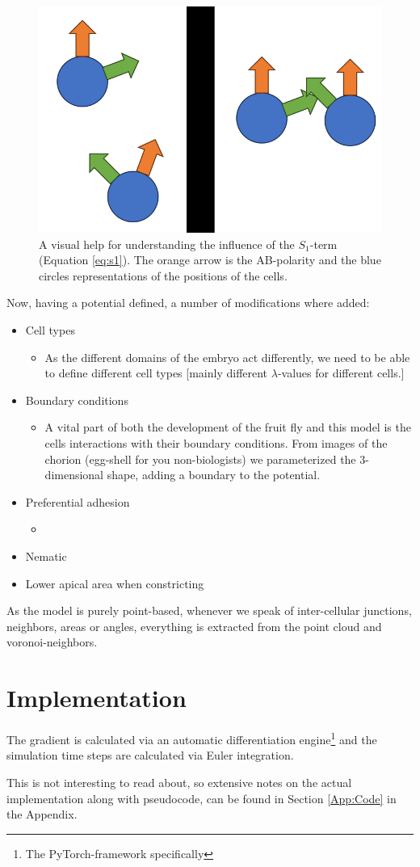 \begin{figure}[H]
    \centering
    \includegraphics[width=0.3\linewidth]{chapters/Theory/figures/explainS1.png}
    \caption{A visual help for understanding the influence of the $S_1$-term (Equation \ref{eq:s1}). The orange arrow is the AB-polarity and the blue circles representations of the positions of the cells.}
    \label{fig:explain-S1}
\end{figure}

Now, having a potential defined, a number of modifications where added:
\begin{itemize}
    \item Cell types
        \begin{itemize}
            \item As the different domains of the embryo act differently, we need to be able to define different cell types [mainly different $\lambda$-values for different cells.]
        \end{itemize}
    \item Boundary conditions
        \begin{itemize}
            \item A vital part of both the development of the fruit fly and this model is the cells interactions with their boundary conditions. From images of the chorion (egg-shell for you non-biologists) we parameterized the 3-dimensional shape, adding a boundary to the potential. 
        \end{itemize}
    \item Preferential adhesion
        \begin{itemize}
            \item 
        \end{itemize}
    \item Nematic 
    \item Lower apical area when constricting
\end{itemize}


As the model is purely point-based, whenever we speak of inter-cellular junctions, neighbors, areas or angles, everything is extracted from the point cloud and voronoi-neighbors.

\section{Implementation}
The gradient is calculated via an automatic differentiation engine\footnote{The PyTorch-framework specifically} and the simulation time steps are calculated via Euler integration.

This is not interesting to read about, so extensive notes on the actual implementation along with pseudocode, can be found in Section \ref{App:Code} in the Appendix.

